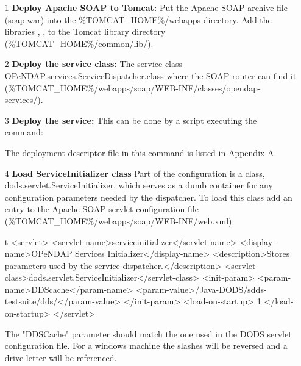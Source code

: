 \documentclass[justify]{dods-paper}
\begin{document}
\begin{itemize}
  \item [1] \textbf{Deploy Apache SOAP to Tomcat:} Put the Apache SOAP 
  archive file (soap.war) 
  into the \%TOMCAT\_HOME\%/webapps directory. Add the libraries , 
  ,  to the Tomcat library directory 
  (\%TOMCAT\_HOME\%/common/lib/).

  \item [2] \textbf{Deploy the service class:} The service class 
  OPeNDAP.services.ServiceDispatcher.class where the SOAP router can find it 
  (\%TOMCAT\_HOME\%/webapps/soap/WEB-INF/classes/opendap-services/).
  
  \item [3] \textbf{Deploy the service:} This can be done by a script 
  executing the command: 
  
  
  The deployment descriptor file in this command is listed in Appendix A.
  
  \item [4] \textbf{Load ServiceInitializer class} Part of the configuration 
  is a class, dods.servlet.ServiceInitializer, 
  which serves as a dumb container for any configuration parameters needed by the 
  dispatcher. To load this class add an entry to the Apache SOAP servlet 
  configuration file (\%TOMCAT\_HOME\%/webapps/soap/WEB-INF/web.xml):\\[2mm]
  
  \begin{vcode}{t}
    <servlet>
        <servlet-name>serviceinitializer</servlet-name>
        <display-name>OPeNDAP Services Initializer</display-name>
        <description>Stores parameters used by the service dispatcher.</description>
        <servlet-class>dods.servlet.ServiceInitializer</servlet-class>
        <init-param>
            <param-name>DDScache</param-name>
            <param-value>/Java-DODS/sdds-testsuite/dds/</param-value>
        </init-param>
        <load-on-startup> 1 </load-on-startup>
    </servlet>
  \end{vcode}
  
  The "DDSCache" parameter should match the one used in the DODS servlet 
  configuration file. For a windows machine the slashes will be reversed 
  and a drive letter will be referenced.

\end{itemize}
\end{document}

